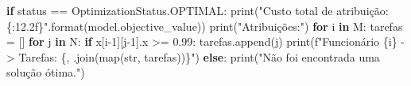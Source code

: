 \documentclass[
  letterpaper,
  DIV=11,
  numbers=noendperiod]{scrartcl}
\newenvironment{Shaded}{\begin{snugshade}}{\end{snugshade}}
\newcommand{\BuiltInTok}[1]{\textcolor[rgb]{0.00,0.23,0.31}{#1}}
\newcommand{\ControlFlowTok}[1]{\textcolor[rgb]{0.00,0.23,0.31}{\textbf{#1}}}
\newcommand{\DecValTok}[1]{\textcolor[rgb]{0.68,0.00,0.00}{#1}}
\newcommand{\FloatTok}[1]{\textcolor[rgb]{0.68,0.00,0.00}{#1}}
\newcommand{\KeywordTok}[1]{\textcolor[rgb]{0.00,0.23,0.31}{\textbf{#1}}}
\newcommand{\NormalTok}[1]{\textcolor[rgb]{0.00,0.23,0.31}{#1}}
\newcommand{\OperatorTok}[1]{\textcolor[rgb]{0.37,0.37,0.37}{#1}}
\newcommand{\SpecialCharTok}[1]{\textcolor[rgb]{0.37,0.37,0.37}{#1}}
\newcommand{\SpecialStringTok}[1]{\textcolor[rgb]{0.13,0.47,0.30}{#1}}
\newcommand{\StringTok}[1]{\textcolor[rgb]{0.13,0.47,0.30}{#1}}
\begin{document}
\begin{Shaded}
\begin{Highlighting}[]
    \ControlFlowTok{if}\NormalTok{ status }\OperatorTok{==}\NormalTok{ OptimizationStatus.OPTIMAL:}
        \BuiltInTok{print}\NormalTok{(}\StringTok{"Custo total de atribuição: }\SpecialCharTok{\{:12.2f\}}\StringTok{"}\NormalTok{.}\BuiltInTok{format}\NormalTok{(model.objective\_value))}
        \BuiltInTok{print}\NormalTok{(}\StringTok{"Atribuições:"}\NormalTok{)}
        \ControlFlowTok{for}\NormalTok{ i }\KeywordTok{in}\NormalTok{ M:}
\NormalTok{            tarefas }\OperatorTok{=}\NormalTok{ []}
            \ControlFlowTok{for}\NormalTok{ j }\KeywordTok{in}\NormalTok{ N:}
                \ControlFlowTok{if}\NormalTok{ x[i}\OperatorTok{{-}}\DecValTok{1}\NormalTok{][j}\OperatorTok{{-}}\DecValTok{1}\NormalTok{].x }\OperatorTok{\textgreater{}=} \FloatTok{0.99}\NormalTok{:  }
\NormalTok{                    tarefas.append(j)}
            \BuiltInTok{print}\NormalTok{(}\SpecialStringTok{f"Funcionário }\SpecialCharTok{\{}\NormalTok{i}\SpecialCharTok{\}}\SpecialStringTok{ {-}\textgreater{} Tarefas: }\SpecialCharTok{\{}\StringTok{\textquotesingle{}, \textquotesingle{}}\SpecialCharTok{.}\NormalTok{join(}\BuiltInTok{map}\NormalTok{(}\BuiltInTok{str}\NormalTok{, tarefas))}\SpecialCharTok{\}}\SpecialStringTok{"}\NormalTok{)}
    \ControlFlowTok{else}\NormalTok{:}
        \BuiltInTok{print}\NormalTok{(}\StringTok{"Não foi encontrada uma solução ótima."}\NormalTok{)}
\end{Highlighting}
\end{Shaded}
\end{document}
